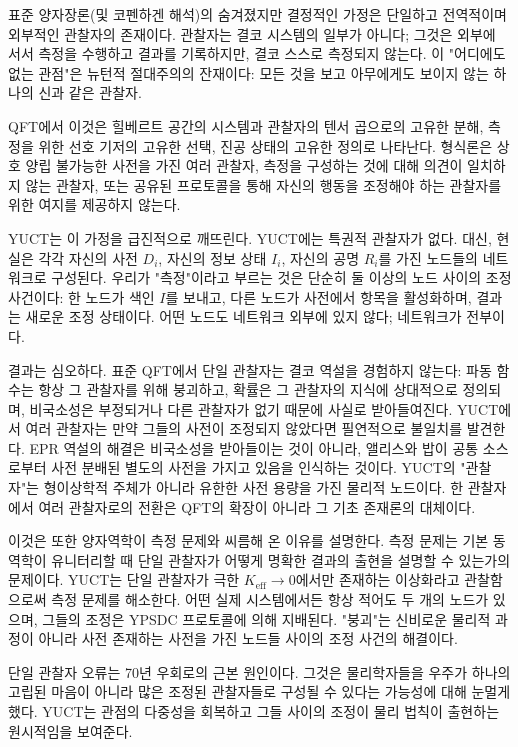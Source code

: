 \documentclass[12pt,a4paper]{article}
\begin{document}
	표준 양자장론(및 코펜하겐 해석)의 숨겨졌지만 결정적인 가정은 단일하고 전역적이며 외부적인 관찰자의 존재이다. 관찰자는 결코 시스템의 일부가 아니다; 그것은 외부에 서서 측정을 수행하고 결과를 기록하지만, 결코 스스로 측정되지 않는다. 이 "어디에도 없는 관점"은 뉴턴적 절대주의의 잔재이다: 모든 것을 보고 아무에게도 보이지 않는 하나의 신과 같은 관찰자.
	
	QFT에서 이것은 힐베르트 공간의 시스템과 관찰자의 텐서 곱으로의 고유한 분해, 측정을 위한 선호 기저의 고유한 선택, 진공 상태의 고유한 정의로 나타난다. 형식론은 상호 양립 불가능한 사전을 가진 여러 관찰자, 측정을 구성하는 것에 대해 의견이 일치하지 않는 관찰자, 또는 공유된 프로토콜을 통해 자신의 행동을 조정해야 하는 관찰자를 위한 여지를 제공하지 않는다.
	
	YUCT는 이 가정을 급진적으로 깨뜨린다. YUCT에는 특권적 관찰자가 없다. 대신, 현실은 각각 자신의 사전 \(D_i\), 자신의 정보 상태 \(I_i\), 자신의 공명 \(R_i\)를 가진 노드들의 네트워크로 구성된다. 우리가 "측정"이라고 부르는 것은 단순히 둘 이상의 노드 사이의 조정 사건이다: 한 노드가 색인 \(I\)를 보내고, 다른 노드가 사전에서 항목을 활성화하며, 결과는 새로운 조정 상태이다. 어떤 노드도 네트워크 외부에 있지 않다; 네트워크가 전부이다.
	
	결과는 심오하다. 표준 QFT에서 단일 관찰자는 결코 역설을 경험하지 않는다: 파동 함수는 항상 그 관찰자를 위해 붕괴하고, 확률은 그 관찰자의 지식에 상대적으로 정의되며, 비국소성은 부정되거나 다른 관찰자가 없기 때문에 사실로 받아들여진다. YUCT에서 여러 관찰자는 만약 그들의 사전이 조정되지 않았다면 필연적으로 불일치를 발견한다. EPR 역설의 해결은 비국소성을 받아들이는 것이 아니라, 앨리스와 밥이 공통 소스로부터 사전 분배된 별도의 사전을 가지고 있음을 인식하는 것이다. YUCT의 "관찰자"는 형이상학적 주체가 아니라 유한한 사전 용량을 가진 물리적 노드이다. 한 관찰자에서 여러 관찰자로의 전환은 QFT의 확장이 아니라 그 기초 존재론의 대체이다.
	
	이것은 또한 양자역학이 측정 문제와 씨름해 온 이유를 설명한다. 측정 문제는 기본 동역학이 유니터리할 때 단일 관찰자가 어떻게 명확한 결과의 출현을 설명할 수 있는가의 문제이다. YUCT는 단일 관찰자가 극한 \(K_{\mathrm{eff}} \to 0\)에서만 존재하는 이상화라고 관찰함으로써 측정 문제를 해소한다. 어떤 실제 시스템에서든 항상 적어도 두 개의 노드가 있으며, 그들의 조정은 YPSDC 프로토콜에 의해 지배된다. "붕괴"는 신비로운 물리적 과정이 아니라 사전 존재하는 사전을 가진 노드들 사이의 조정 사건의 해결이다.
	
	단일 관찰자 오류는 70년 우회로의 근본 원인이다. 그것은 물리학자들을 우주가 하나의 고립된 마음이 아니라 많은 조정된 관찰자들로 구성될 수 있다는 가능성에 대해 눈멀게 했다. YUCT는 관점의 다중성을 회복하고 그들 사이의 조정이 물리 법칙이 출현하는 원시적임을 보여준다.
	
\end{document}
